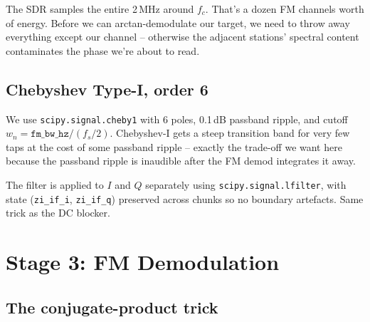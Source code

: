 \documentclass[11pt,a4paper]{article}
\begin{document}
The SDR samples the entire 2\,MHz around \(f_c\).  That's a dozen FM
channels worth of energy.  Before we can arctan-demodulate our target,
we need to throw away everything except our channel -- otherwise the
adjacent stations' spectral content contaminates the phase we're about
to read.

\subsection{Chebyshev Type-I, order 6}

We use \texttt{scipy.signal.cheby1} with 6 poles, 0.1\,dB passband
ripple, and cutoff \(w_n = \texttt{fm\_bw\_hz} / (f_s/2)\).  Chebyshev-I
gets a steep transition band for very few taps at the cost of some
passband ripple -- exactly the trade-off we want here because the
passband ripple is inaudible after the FM demod integrates it away.

\begin{center}
\end{center}

The filter is applied to \(I\) and \(Q\) separately using
\texttt{scipy.signal.lfilter}, with state (\texttt{zi\_if\_i},
\texttt{zi\_if\_q}) preserved across chunks so no boundary artefacts.
Same trick as the DC blocker.

\section{Stage 3: FM Demodulation}

\subsection{The conjugate-product trick}
\end{document}
